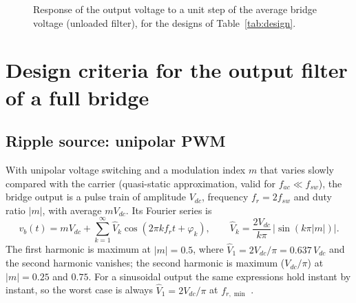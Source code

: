 \documentclass[11pt,a4paper]{article}
\begin{document}
\begin{figure}[htb]
\centering
{}
\caption{Response of the output voltage to a unit step of the average bridge voltage
(unloaded filter), for the designs of Table~\ref{tab:design}.}
\label{fig:step}
\end{figure}

\section{Design criteria for the output filter of a full bridge}
\label{sec:criteria}

\subsection{Ripple source: unipolar PWM}
\label{sec:pwm}

With unipolar voltage switching and a modulation index $m$ that varies slowly compared
with the carrier (quasi-static approximation, valid for $f_{ac} \ll f_{sw}$), the bridge
output is a pulse train of amplitude $V_{dc}$, frequency $f_r = 2 f_{sw}$ and duty
ratio $|m|$, with average $m V_{dc}$. Its Fourier series is
\begin{equation}
v_b(t) = m V_{dc} + \sum_{k=1}^{\infty} \hat V_k \cos(2\pi k f_r t + \varphi_k), \qquad
\hat V_k = \frac{2 V_{dc}}{k\pi}\,\bigl|\sin(k\pi |m|)\bigr|.
\label{eq:pwm}
\end{equation}
The first harmonic is maximum at $|m| = 0.5$, where $\hat V_1 = 2V_{dc}/\pi = 0.637\,V_{dc}$
and the second harmonic vanishes; the second harmonic is maximum ($V_{dc}/\pi$) at
$|m| = 0.25$ and $0.75$. For a sinusoidal output the same expressions hold instant by
instant, so the worst case is always $\hat V_1 = 2V_{dc}/\pi$ at $f_{r,\min}$
\cite{HolmesLipo,Mohan}.
\end{document}

